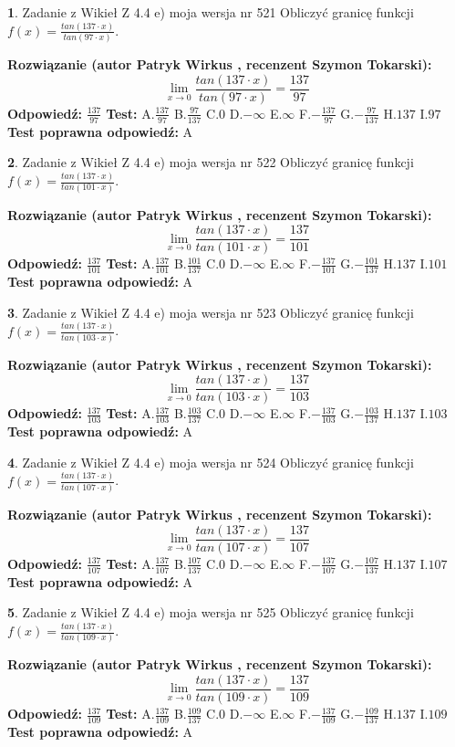 \documentclass[12pt, a4paper]{article}
\theoremstyle{definition} %
\newtheorem{zad}{}
\newcommand{\zadStart}[1]{\begin{zad}#1\newline}
\newcommand{\zadStop}{\end{zad}}
\newcommand{\rozwStart}[2]{\noindent \textbf{Rozwiązanie (autor #1 , recenzent #2): }\newline}
\newcommand{\rozwStop}{\newline}
\newcommand{\odpStart}{\noindent \textbf{Odpowiedź:}\newline}
\newcommand{\odpStop}{\newline}
\newcommand{\testStart}{\noindent \textbf{Test:}\newline}
\newcommand{\testStop}{\newline}
\newcommand{\kluczStart}{\noindent \textbf{Test poprawna odpowiedź:}\newline}
\newcommand{\kluczStop}{\newline}
\begin{document}
\zadStart{Zadanie z Wikieł Z 4.4 e) moja wersja nr 521}
Obliczyć granicę funkcji $f(x)=\frac{tan(137\cdot x)}{tan(97\cdot x)}$.
\zadStop
\rozwStart{Patryk Wirkus}{Szymon Tokarski}
$$\lim\limits_{x\to 0}\frac{tan(137\cdot x)}{tan(97\cdot x)}=
\frac{137}{97}$$
\rozwStop
\odpStart
$\frac{137}{97}$
\odpStop
\testStart
A.$\frac{137}{97}$
B.$\frac{97}{137}$
C.$0$
D.$-\infty$
E.$\infty$
F.$-\frac{137}{97}$
G.$-\frac{97}{137}$
H.$137$
I.$97$
\testStop
\kluczStart
A
\kluczStop



\zadStart{Zadanie z Wikieł Z 4.4 e) moja wersja nr 522}
Obliczyć granicę funkcji $f(x)=\frac{tan(137\cdot x)}{tan(101\cdot x)}$.
\zadStop
\rozwStart{Patryk Wirkus}{Szymon Tokarski}
$$\lim\limits_{x\to 0}\frac{tan(137\cdot x)}{tan(101\cdot x)}=
\frac{137}{101}$$
\rozwStop
\odpStart
$\frac{137}{101}$
\odpStop
\testStart
A.$\frac{137}{101}$
B.$\frac{101}{137}$
C.$0$
D.$-\infty$
E.$\infty$
F.$-\frac{137}{101}$
G.$-\frac{101}{137}$
H.$137$
I.$101$
\testStop
\kluczStart
A
\kluczStop



\zadStart{Zadanie z Wikieł Z 4.4 e) moja wersja nr 523}
Obliczyć granicę funkcji $f(x)=\frac{tan(137\cdot x)}{tan(103\cdot x)}$.
\zadStop
\rozwStart{Patryk Wirkus}{Szymon Tokarski}
$$\lim\limits_{x\to 0}\frac{tan(137\cdot x)}{tan(103\cdot x)}=
\frac{137}{103}$$
\rozwStop
\odpStart
$\frac{137}{103}$
\odpStop
\testStart
A.$\frac{137}{103}$
B.$\frac{103}{137}$
C.$0$
D.$-\infty$
E.$\infty$
F.$-\frac{137}{103}$
G.$-\frac{103}{137}$
H.$137$
I.$103$
\testStop
\kluczStart
A
\kluczStop



\zadStart{Zadanie z Wikieł Z 4.4 e) moja wersja nr 524}
Obliczyć granicę funkcji $f(x)=\frac{tan(137\cdot x)}{tan(107\cdot x)}$.
\zadStop
\rozwStart{Patryk Wirkus}{Szymon Tokarski}
$$\lim\limits_{x\to 0}\frac{tan(137\cdot x)}{tan(107\cdot x)}=
\frac{137}{107}$$
\rozwStop
\odpStart
$\frac{137}{107}$
\odpStop
\testStart
A.$\frac{137}{107}$
B.$\frac{107}{137}$
C.$0$
D.$-\infty$
E.$\infty$
F.$-\frac{137}{107}$
G.$-\frac{107}{137}$
H.$137$
I.$107$
\testStop
\kluczStart
A
\kluczStop



\zadStart{Zadanie z Wikieł Z 4.4 e) moja wersja nr 525}
Obliczyć granicę funkcji $f(x)=\frac{tan(137\cdot x)}{tan(109\cdot x)}$.
\zadStop
\rozwStart{Patryk Wirkus}{Szymon Tokarski}
$$\lim\limits_{x\to 0}\frac{tan(137\cdot x)}{tan(109\cdot x)}=
\frac{137}{109}$$
\rozwStop
\odpStart
$\frac{137}{109}$
\odpStop
\testStart
A.$\frac{137}{109}$
B.$\frac{109}{137}$
C.$0$
D.$-\infty$
E.$\infty$
F.$-\frac{137}{109}$
G.$-\frac{109}{137}$
H.$137$
I.$109$
\testStop
\kluczStart
A
\kluczStop
\end{document}
